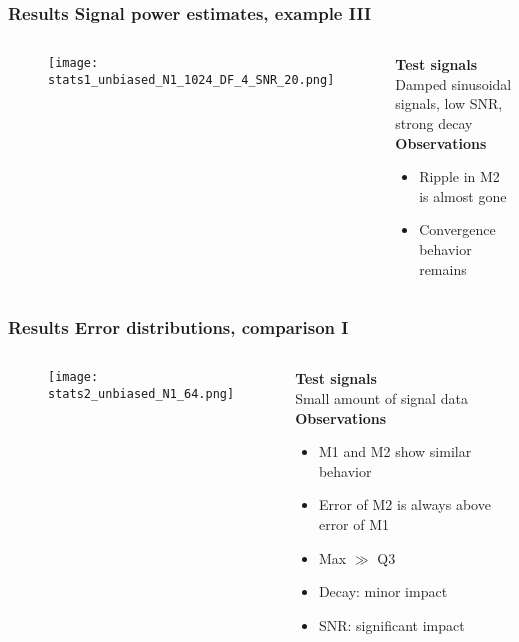\documentclass[11pt,aspectratio=169]{beamer}
\begin{document}
	\begin{frame}
		\frametitle{Results \textendash{} Signal power estimates, example III}
		\begin{columns}[t]
			\begin{RIPcolleft}
				\begin{figure}
					\texttt{[image: stats1\_unbiased\_N1\_1024\_DF\_4\_SNR\_20.png]}
				\end{figure}
			\end{RIPcolleft}
			\begin{RIPcolright}
				\textbf{Test signals}\\
				Damped sinusoidal signals, low SNR, strong decay\\
				\vspace*{.5em}
				\textbf{Observations}\\
				\begin{itemize}
					\item Ripple in M2 is almost gone
					\item Convergence behavior remains
				\end{itemize}
			\end{RIPcolright}
		\end{columns}
	\end{frame}
	\begin{frame}
		\frametitle{Results \textendash{} Error distributions, comparison I}
		\begin{columns}[t]
			\begin{RIPcolleft}
				\begin{figure}
					\texttt{[image: stats2\_unbiased\_N1\_64.png]}
				\end{figure}
			\end{RIPcolleft}
			\begin{RIPcolright}
				\textbf{Test signals}\\
				Small amount of signal data\\
				\vspace*{.5em}
				\textbf{Observations}\\
				\begin{itemize}
					\item M1 and M2 show similar behavior
					\item Error of M2 is always above error of M1
					\item Max $\gg$ Q3
					\item Decay: minor impact
					\item SNR: significant impact
				\end{itemize}
			\end{RIPcolright}
		\end{columns}
	\end{frame}
\end{document}
